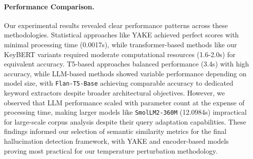 \documentclass[sigconf]{acmart}
\begin{document}
\paragraph{Performance Comparison.}
Our experimental results revealed clear performance patterns across these methodologies. Statistical approaches like YAKE achieved perfect scores with minimal processing time (0.0017s), while transformer-based methods like our KeyBERT variants required moderate computational resources (1.6-2.0s) for equivalent accuracy. T5-based approaches balanced performance (3.4s) with high accuracy, while LLM-based methods showed variable performance depending on model size, with \texttt{Flan-T5-Base} achieving comparable accuracy to dedicated keyword extractors despite broader architectural objectives. However, we observed that LLM performance scaled with parameter count at the expense of processing time, making larger models like \texttt{SmolLM2-360M} (12.0984s) impractical for large-scale corpus analysis despite their query adaptation capabilities. These findings informed our selection of semantic similarity metrics for the final hallucination detection framework, with YAKE and encoder-based models proving most practical for our temperature perturbation methodology.
\end{document}
